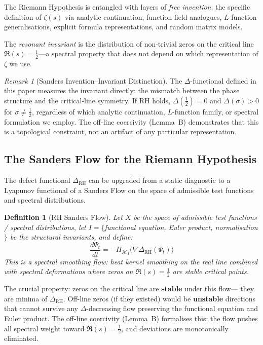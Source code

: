 \documentclass[11pt]{article}
\newtheorem{definition}[theorem]{Definition}
\theoremstyle{remark}
\newtheorem{remark}[theorem]{Remark}
\begin{document}
The Riemann Hypothesis is entangled with layers of \emph{free invention}: the specific
definition of $\zeta(s)$ via analytic continuation, function field analogues,
$L$-function generalisations, explicit formula representations, and random matrix
models.

The \emph{resonant invariant} is the distribution of non-trivial zeros on the
critical line $\Re(s) = \tfrac{1}{2}$---a spectral property that does not depend on
which representation of $\zeta$ we use.

\begin{remark}[Sanders Invention--Invariant Distinction]
The $\Delta$-functional defined in this paper measures the invariant directly:
the mismatch between the phase structure and the critical-line symmetry.
If RH holds, $\Delta(\tfrac{1}{2}) = 0$ and $\Delta(\sigma) > 0$ for
$\sigma \neq \tfrac{1}{2}$, regardless of which analytic continuation,
$L$-function family, or spectral formulation we employ. The off-line
coercivity (Lemma~B) demonstrates that this is a topological constraint,
not an artifact of any particular representation.
\end{remark}

\subsection*{The Sanders Flow for the Riemann Hypothesis}

The defect functional $\Delta_{\mathrm{RH}}$ can be upgraded from a static diagnostic
to a Lyapunov functional of a Sanders Flow on the space of admissible test functions
and spectral distributions.

\begin{definition}[RH Sanders Flow]
Let $X$ be the space of admissible test functions / spectral distributions, let
$I = \{$functional equation, Euler product, normalisation$\}$ be the structural
invariants, and define:
\[
  \frac{d\Psi_t}{dt} = -\Pi_{\mathcal{M}_I}\!\bigl(\nabla \Delta_{\mathrm{RH}}(\Psi_t)\bigr)
\]
This is a \emph{spectral smoothing flow}: heat kernel smoothing on the real line
combined with spectral deformations where zeros on $\Re(s) = \tfrac{1}{2}$ are stable
critical points.
\end{definition}

\noindent
The crucial property: zeros on the critical line are \textbf{stable} under this flow---
they are minima of $\Delta_{\mathrm{RH}}$.  Off-line zeros (if they existed) would be
\textbf{unstable} directions that cannot survive any $\Delta$-decreasing flow preserving
the functional equation and Euler product.  The off-line coercivity (Lemma~B) formalises
this: the flow pushes all spectral weight toward $\Re(s) = \tfrac{1}{2}$, and deviations
are monotonically eliminated.
\end{document}
